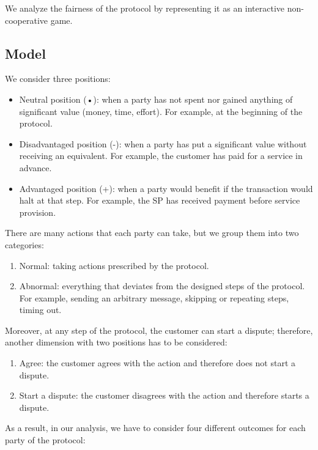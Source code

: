 \documentclass{ieeeaccess}
\begin{document}
We analyze the fairness of the protocol by representing it as an interactive non-cooperative game.

\subsection{Model}\label{model}
We consider three positions:

\begin{itemize}
\item Neutral position (•): when a party has not spent nor gained anything of significant value (money, time, effort). For example, at the beginning of the protocol.
\item Disadvantaged position (-): when a party has put a significant value without receiving an equivalent. For example, the customer has paid for a service in advance.
\item Advantaged position (+): when a party would benefit if the transaction would halt at that step. For example, the SP has received payment before service provision.
\end{itemize}

There are many actions that each party can take, but we group them into two categories:

\begin{enumerate}
\def\labelenumi{\arabic{enumi}.}

\item Normal: taking actions prescribed by the protocol.
\item Abnormal: everything that deviates from the designed steps of the protocol. For example, sending an arbitrary message, skipping or repeating steps, timing out.
\end{enumerate}

Moreover, at any step of the protocol, the customer can start a dispute; therefore, another dimension with two positions has to be considered:

\begin{enumerate}
\def\labelenumi{\arabic{enumi}.}

\item Agree: the customer agrees with the action and therefore does not start a dispute.
\item Start a dispute: the customer disagrees with the action and therefore starts a dispute.
\end{enumerate}

As a result, in our analysis, we have to consider four different outcomes for each party of the protocol:
\end{document}
